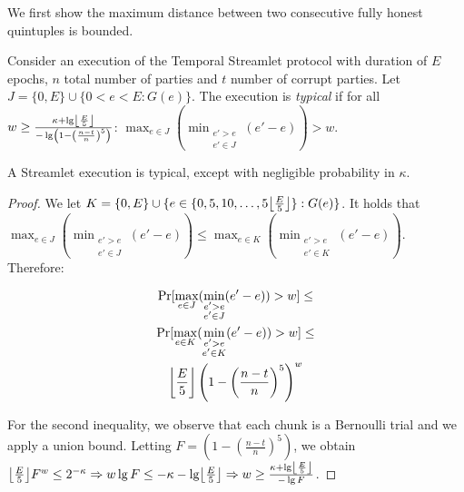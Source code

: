 We first show the maximum distance between two consecutive fully honest quintuples
is bounded.

\begin{definition}
  Consider an execution of the Temporal Streamlet protocol with duration
  of $E$ epochs, $n$ total number of parties and $t$ number of corrupt parties.
  Let $J = \{0,E\} \cup \{0 < e < E: G(e)\}$.
  The execution is \emph{typical} if for all
  $w \geq \frac{\kappa + \lg \floor*{\frac{E}{5}}}{- \lg \left(1 - \left(\frac{n - t}{n}\right)^5\right)}$:
  $\max_{e \in J}(\min_{\substack{e' > e \\ e' \in J}}(e' - e)) > w$.
\end{definition}

\begin{lemma} \label{lem:honest-quintuple}
  A Streamlet execution is typical, except with negligible probability in $\kappa$.
\end{lemma}
\begin{proof}
  We let $K = \{0, E\} \cup \{e \in \{0, 5, 10 ,\ldots, 5\floor*{\frac{E}{5}}\}: G(e)\}$.
  It holds that
  $\max_{e \in J}(\min_{\substack{e' > e \\ e' \in J}}(e' - e)) \leq \max_{e \in K}(\min_{\substack{e' > e \\ e' \in K}}(e' - e))$.
  Therefore:

  \begin{gather*}
      \Pr [\max_{e \in J}(\min_{\substack{e' > e \\ e' \in J}}(e' - e)) > w] \leq \\
      \Pr [\max_{e \in K}(\min_{\substack{e' > e \\ e' \in K}}(e' - e)) > w] \leq \\
      \floor*{\frac{E}{5}} \left(1 - \left(\frac{n - t}{n}\right)^5\right)^w
  \end{gather*}

  For the second inequality, we observe that each chunk is a Bernoulli trial and we
  apply a union bound.
  Letting $F = \left(1 - \left(\frac{n - t}{n}\right)^5\right)$, we obtain
  $\floor*{\frac{E}{5}} F^w \leq 2^{-\kappa} \Rightarrow
   w \lg F \leq -\kappa - \lg \floor*{\frac{E}{5}} \Rightarrow
   w \geq \frac{\kappa + \lg \floor*{\frac{E}{5}}}{- \lg F}
  $.
  \Qed
\end{proof}


